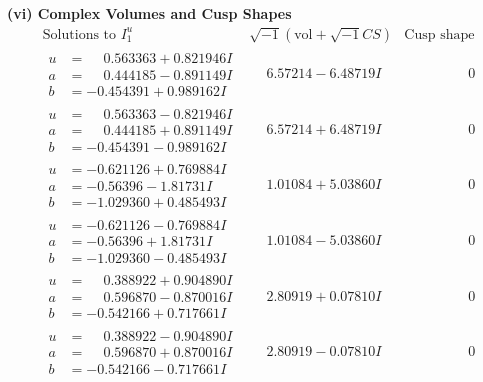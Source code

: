 \documentclass[1p]{elsarticle_modified}
\theoremstyle{definition}
\newcommand{\I}{\sqrt{-1}}
\begin{document}
\newpage\flushleft \textbf{(vi) Complex Volumes and Cusp Shapes}
$$\begin{array}{c|c|c}  
\text{Solutions to }I^u_{1}& \I (\text{vol} + \sqrt{-1}CS) & \text{Cusp shape}\\
 \hline 
\begin{aligned}
u &= \phantom{-}0.563363 + 0.821946 I \\
a &= \phantom{-}0.444185 - 0.891149 I \\
b &= -0.454391 + 0.989162 I\end{aligned}
 & \phantom{-}6.57214 - 6.48719 I & \phantom{-0.000000 } 0 \\ \hline\begin{aligned}
u &= \phantom{-}0.563363 - 0.821946 I \\
a &= \phantom{-}0.444185 + 0.891149 I \\
b &= -0.454391 - 0.989162 I\end{aligned}
 & \phantom{-}6.57214 + 6.48719 I & \phantom{-0.000000 } 0 \\ \hline\begin{aligned}
u &= -0.621126 + 0.769884 I \\
a &= -0.56396 - 1.81731 I \\
b &= -1.029360 + 0.485493 I\end{aligned}
 & \phantom{-}1.01084 + 5.03860 I & \phantom{-0.000000 } 0 \\ \hline\begin{aligned}
u &= -0.621126 - 0.769884 I \\
a &= -0.56396 + 1.81731 I \\
b &= -1.029360 - 0.485493 I\end{aligned}
 & \phantom{-}1.01084 - 5.03860 I & \phantom{-0.000000 } 0 \\ \hline\begin{aligned}
u &= \phantom{-}0.388922 + 0.904890 I \\
a &= \phantom{-}0.596870 - 0.870016 I \\
b &= -0.542166 + 0.717661 I\end{aligned}
 & \phantom{-}2.80919 + 0.07810 I & \phantom{-0.000000 } 0 \\ \hline\begin{aligned}
u &= \phantom{-}0.388922 - 0.904890 I \\
a &= \phantom{-}0.596870 + 0.870016 I \\
b &= -0.542166 - 0.717661 I\end{aligned}
 & \phantom{-}2.80919 - 0.07810 I & \phantom{-0.000000 } 0 \\ \hline\begin{aligned}

\end{aligned}
\end{array}$$
\end{document}
